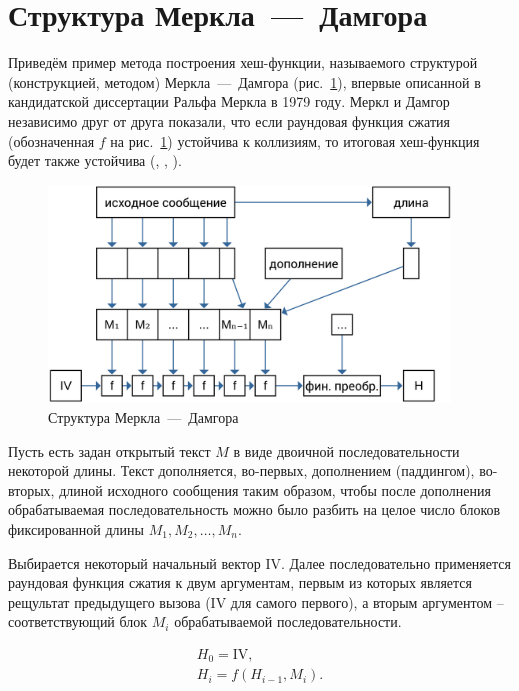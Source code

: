 \section{Структура Меркла~---~Дамгора}\label{sec:merkle-damgard}

Приведём пример метода построения хеш-функции, называемого структурой (конструкцией, методом) Меркла~---~Дамгора (рис.~\ref{fig:merkle-damgard}), впервые описанной в кандидатской диссертации Ральфа Меркла в 1979 году. Меркл и Дамгор независимо друг от друга показали, что если раундовая функция сжатия (обозначенная $f$ на рис.~\ref{fig:merkle-damgard}) устойчива к коллизиям, то итоговая хеш-функция будет также устойчива (, , \cite{Merkle:1979, Merkle:1990, Damgard:1990}).

\begin{figure}[htb]
    \centering
    \includegraphics[width=0.95\textwidth]{pic/merkle-damgard}
    \caption{Структура Меркла~---~Дамгора}
    \label{fig:merkle-damgard}
\end{figure}

Пусть есть задан открытый текст $M$ в виде двоичной последовательности некоторой длины. Текст дополняется, во-первых, дополнением (паддингом), во-вторых, длиной исходного сообщения таким образом, чтобы после дополнения обрабатываемая последовательность можно было разбить на целое число блоков фиксированной длины $M_1, M_2, \dots, M_n$.

Выбирается некоторый начальный вектор IV. Далее последовательно применяется раундовая функция сжатия к двум аргументам, первым из которых является рещультат предыдущего вызова (IV для самого первого), а вторым аргументом -- соответствующий блок $M_i$ обрабатываемой последовательности.

\[\begin{array}{l}
H_0 = \text{IV},\\
H_i = f ( H_{i-1}, M_i ).\\
\end{array}\]

